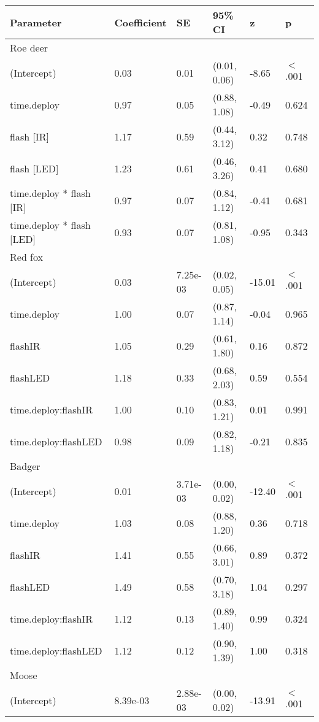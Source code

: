 \begin{table}[ht]
\centering
\begin{tabular}{llllll}
  \hline
Parameter & Coefficient & SE & 95\% CI & z & p \\ 
  \hline
Roe deer &  &  &  &  &        \\ 
  (Intercept) & 0.03 & 0.01 & (0.01, 0.06) & -8.65 & $<$ .001 \\ 
  time.deploy & 0.97 & 0.05 & (0.88, 1.08) & -0.49 & 0.624  \\ 
  flash [IR] & 1.17 & 0.59 & (0.44, 3.12) & 0.32 & 0.748  \\ 
  flash [LED] & 1.23 & 0.61 & (0.46, 3.26) & 0.41 & 0.680  \\ 
  time.deploy * flash [IR] & 0.97 & 0.07 & (0.84, 1.12) & -0.41 & 0.681  \\ 
  time.deploy * flash [LED] & 0.93 & 0.07 & (0.81, 1.08) & -0.95 & 0.343  \\ 
  Red fox &  &  &  &  &        \\ 
  (Intercept) & 0.03 & 7.25e-03 & (0.02, 0.05) & -15.01 & $<$ .001 \\ 
  time.deploy & 1.00 & 0.07 & (0.87, 1.14) & -0.04 & 0.965  \\ 
  flashIR & 1.05 & 0.29 & (0.61, 1.80) & 0.16 & 0.872  \\ 
  flashLED & 1.18 & 0.33 & (0.68, 2.03) & 0.59 & 0.554  \\ 
  time.deploy:flashIR & 1.00 & 0.10 & (0.83, 1.21) & 0.01 & 0.991  \\ 
  time.deploy:flashLED & 0.98 & 0.09 & (0.82, 1.18) & -0.21 & 0.835  \\ 
  Badger &  &  &  &  &        \\ 
  (Intercept) & 0.01 & 3.71e-03 & (0.00, 0.02) & -12.40 & $<$ .001 \\ 
  time.deploy & 1.03 & 0.08 & (0.88, 1.20) & 0.36 & 0.718  \\ 
  flashIR & 1.41 & 0.55 & (0.66, 3.01) & 0.89 & 0.372  \\ 
  flashLED & 1.49 & 0.58 & (0.70, 3.18) & 1.04 & 0.297  \\ 
  time.deploy:flashIR & 1.12 & 0.13 & (0.89, 1.40) & 0.99 & 0.324  \\ 
  time.deploy:flashLED & 1.12 & 0.12 & (0.90, 1.39) & 1.00 & 0.318  \\ 
  Moose &  &  &  &  &        \\ 
  (Intercept) & 8.39e-03 & 2.88e-03 & (0.00, 0.02) & -13.91 & $<$ .001 \\ 

\end{tabular}
\end{table}
